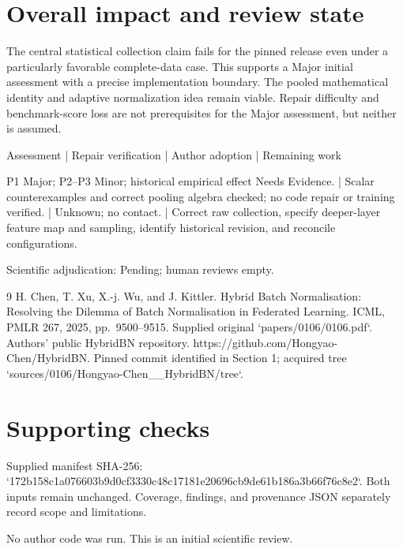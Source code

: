 \documentclass[10pt]{article}
\begin{document}
\section*{Overall impact and review state}
The central statistical collection claim fails for the pinned release even under a particularly favorable complete-data case. This supports a Major initial assessment with a precise implementation boundary. The pooled mathematical identity and adaptive normalization idea remain viable. Repair difficulty and benchmark-score loss are not prerequisites for the Major assessment, but neither is assumed.\par
Assessment | Repair verification | Author adoption | Remaining work\par
P1 Major; P2–P3 Minor; historical empirical effect Needs Evidence. | Scalar counterexamples and correct pooling algebra checked; no code repair or training verified. | Unknown; no contact. | Correct raw collection, specify deeper-layer feature map and sampling, identify historical revision, and reconcile configurations.\par
Scientific adjudication: Pending; human reviews empty.\par
9 H. Chen, T. Xu, X.-j. Wu, and J. Kittler. Hybrid Batch Normalisation: Resolving the Dilemma of Batch Normalisation in Federated Learning. ICML, PMLR 267, 2025, pp. 9500–9515. Supplied original `papers/0106/0106.pdf`. Authors’ public HybridBN repository. https://github.com/Hongyao-Chen/HybridBN. Pinned commit identified in Section 1; acquired tree `sources/0106/Hongyao-Chen\_\_HybridBN/tree`.\par
\section*{Supporting checks}
Supplied manifest SHA-256: `172b158c1a076603b9d0cf3330c48c17181e20696cb9de61b186a3b66f76c8e2`. Both inputs remain unchanged. Coverage, findings, and provenance JSON separately record scope and limitations.\par
No author code was run. This is an initial scientific review.\par
\end{document}
